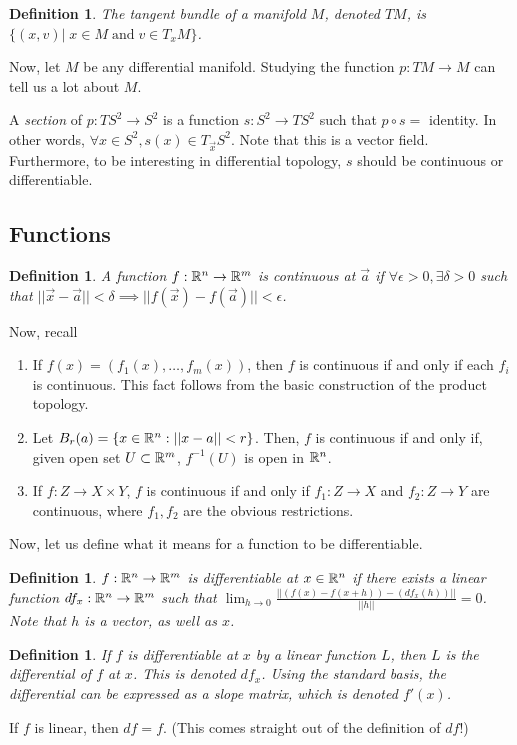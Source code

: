 \documentclass[11pt,leqno,oneside]{amsart}
\theoremstyle{mystyle} \newtheorem{thrm}[thm]{Theorem}
\theoremstyle{mystyle} \newtheorem{defi}[thm]{Definition}
\begin{document}
\begin{defi}
	The \emph{tangent bundle} of a manifold $M$, denoted $TM$, is $\{ (x,v) |\; x \in M \;\text{and}\; v \in T_xM \}$.
\end{defi}

Now, let $M$ be any differential manifold. Studying the function $p: TM \to M$
can tell us a lot about $M$.

\begin{example}
	A \emph{section} of $p: TS^2 \to S^2$ is a function $s: S^2 \to TS^2$ such
	that $p \circ s =$ identity. In other words, $\forall x \in S^2, s(x) \in
	T_{\vec{x}}S^2$. Note that this is a vector field. Furthermore, to be
	interesting in differential topology, $s$ should be continuous or
	differentiable.
\end{example}



\subsection{Functions}

\begin{defi}
	A function $f: {\mathbb R}^n \to {\mathbb R}^m$ is continuous at $\vec{a}$ if $\forall
	\epsilon > 0, \exists \delta > 0$ such that $||\vec{x}-\vec{a}|| < \delta
	\implies ||f(\vec{x}) - f(\vec{a})|| < \epsilon$.
\end{defi}
Now, recall \begin{enumerate}
	\item If $f(x) = (f_1(x), \ldots, f_m(x))$, then $f$ is continuous if and
		only if each $f_i$ is continuous. This fact follows from the basic
		construction of the product topology.
	\item Let $B_r(a) = \{x \in {\mathbb R}^n : ||x-a|| < r\}$. Then, $f$ is continuous
		if and only if, given open set $U \subset {\mathbb R}^m$, $f^{-1}(U)$ is open in
		${\mathbb R}^n$.
	\item If $f: Z \to X \times Y$, $f$ is continuous if and only if $f_1: Z
		\to X$ and $f_2: Z \to Y$ are continuous, where $f_1, f_2$ are the
		obvious restrictions.
\end{enumerate}

Now, let us define what it means for a function to be differentiable.
\begin{defi}
	$f :{\mathbb R}^n \to {\mathbb R}^m$ is \emph{differentiable} at $x \in {\mathbb R}^n$ if there exists a linear function $df_x : {\mathbb R}^n \to {\mathbb R}^m$  such that $\lim_{h \to 0} \frac{|| (f(x)-f(x+h)) - (df_x(h)) ||}{||h||} = 0$.  Note that $h$ is a vector, as well as $x$.
\end{defi}
\begin{defi}
	If $f$ is differentiable at $x$ by a linear function $L$, then $L$ is the \emph{differential} of $f$ at $x$.  This is denoted $df_x$.  Using the standard basis, the differential can be expressed as a slope matrix, which is denoted $f'(x)$.
\end{defi}
\begin{cor}
	If $f$ is linear, then $df = f$.  (This comes straight out of the definition of $df$!)
\end{cor}
\end{document}
